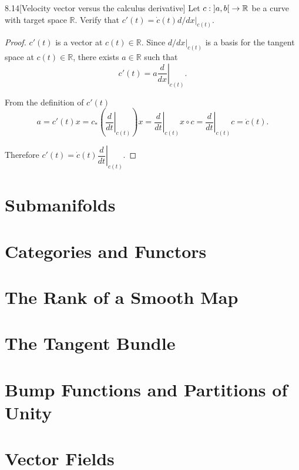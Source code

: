 \begin{exercise}{8.14}[Velocity vector versus the calculus derivative]
    Let \( c: \left\rbrack{a, b}\right\lbrack \to \mathbb{R} \) be a curve with target space \( \mathbb{R} \). Verify that \( c'(t) = \dot{c}(t) d/dx\vert_{c(t)} \).
\end{exercise}

\begin{proof}
    \( c'(t) \) is a vector at \( c(t) \in \mathbb{R} \). Since \( d/dx\vert_{c(t)} \) is a basis for the tangent space at \( c(t) \in \mathbb{R} \), there exists \( a\in \mathbb{R} \) such that
    \[
        c'(t) = a\left.\dfrac{d}{dx}\right\vert_{c(t)}.
    \]

    From the definition of \( c'(t) \)
    \[
        a = c'(t)x = c_{\ast}\left(\left.\dfrac{d}{dt}\right\vert_{c(t)}\right)x = \left.\dfrac{d}{dt}\right\vert_{c(t)} x\circ c = \left.\dfrac{d}{dt}\right\vert_{c(t)} c = \dot{c}(t).
    \]

    Therefore \( c'(t) = \dot{c}(t) \left.\dfrac{d}{dt}\right\vert_{c(t)} \).
\end{proof}

\section{Submanifolds}

\section{Categories and Functors}

\section{The Rank of a Smooth Map}

\section{The Tangent Bundle}

\section{Bump Functions and Partitions of Unity}

\section{Vector Fields}
